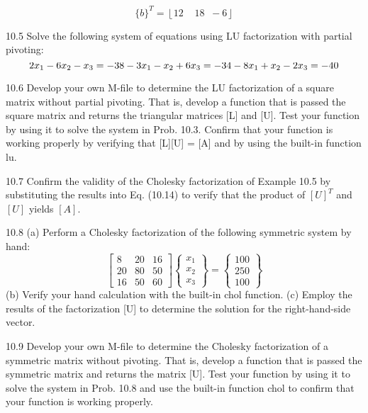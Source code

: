 \documentclass[../main.tex]{subfiles}
\begin{document}
\begin{equation}
\{b\}^{T} = \left \lfloor 12 \;\;\;\; 18\;\;-6 \right \rfloor
\end{equation}


10.5 Solve the following system of equations using LU
factorization with partial pivoting:
\begin{equation}
2x_{1} - 6x_{2} - x_{3} = -38\\
-3x_{1} - x_{2} + 6x_{3} = -34\\
-8x_{1} + x_{2} - 2x_{3} = -40
\end{equation}


10.6 Develop your own M-file to determine the LU factorization of a square matrix without partial pivoting. That is, develop a function that is passed the square matrix and returns the triangular matrices [L] and [U]. Test your function by
using it to solve the system in Prob. 10.3. Confirm that your
function is working properly by verifying that [L][U] = [A]
and by using the built-in function lu.


10.7 Confirm the validity of the Cholesky factorization of
Example 10.5 by substituting the results into Eq. (10.14) to
verify that the product of $[U]^{T}$ and $[U]$ yields $[A]$.


10.8 (a) Perform a Cholesky factorization of the following symmetric system by hand:
\begin{equation}
\begin{bmatrix}
8& 20& 16\\
20& 80& 50\\
16& 50& 60
\end{bmatrix}
\begin{Bmatrix}
x_{1}\\ 
x_{2}\\ 
x_{3}
\end{Bmatrix}=
\begin{Bmatrix}
100\\ 
250\\ 
100
\end{Bmatrix}
\end{equation}
(b) Verify your hand calculation with the built-in chol
function. (c) Employ the results of the factorization [U] to
determine the solution for the right-hand-side vector.


10.9 Develop your own M-file to determine the Cholesky
factorization of a symmetric matrix without pivoting. That is, develop a function that is passed the symmetric matrix and returns the matrix [U]. Test your function by using it to
solve the system in Prob. 10.8 and use the built-in function chol to confirm that your function is working properly.
\end{document}
